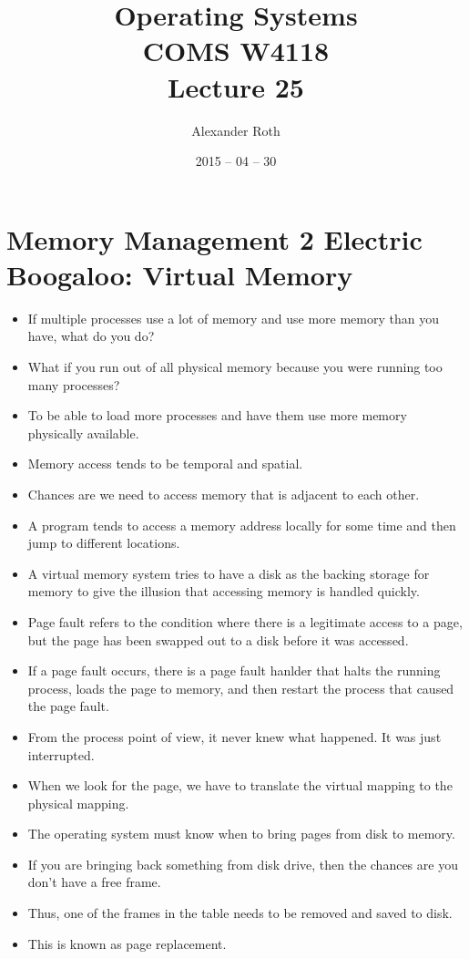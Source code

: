 \documentclass[]{article}
\begin{document}
\newtheorem{thm}{Theorem}
\title{Operating Systems \\ COMS W4118 \\ Lecture 25}
\author{Alexander Roth}
\date{2015 -- 04 -- 30}
\maketitle

\section{Memory Management 2 Electric Boogaloo: Virtual Memory}
\begin{itemize}
\item If multiple processes use a lot of memory and use more memory than you
have, what do you do?
\item What if you run out of all physical memory because you were running too
many processes?
\item To be able to load more processes and have them use more memory physically
available.
\item Memory access tends to be temporal and spatial.
\item Chances are we need to access memory that is adjacent to each other.
\item A program tends to access a memory address locally for some time and then
jump to different locations.
\item A virtual memory system tries to have a disk as the backing storage for
memory to give the illusion that accessing memory is handled quickly.
\item Page fault refers to the condition where there is a legitimate access to a
page, but the page has been swapped out to a disk before it was accessed.
\item If a page fault occurs, there is a page fault hanlder that halts the
running process, loads the page to memory, and then restart the process that
caused the page fault.
\item From the process point of view, it never knew what happened. It was just
interrupted.
\item When we look for the page, we have to translate the virtual mapping to the
physical mapping.
\item The operating system must know when to bring pages from disk to memory.
\item If you are bringing back something from disk drive, then the chances are
you don't have a free frame.
\item Thus, one of the frames in the table needs to be removed and saved to
disk.
\item This is known as page replacement.
\end{itemize}
\end{document}
